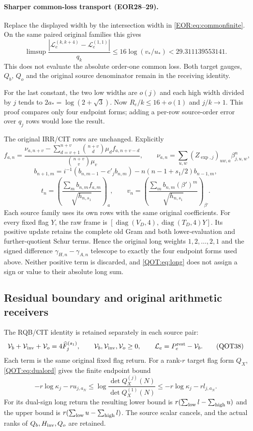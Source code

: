 \documentclass[11pt,a4paper]{article}
\begin{document}
\paragraph{Sharper common-loss transport (EOR28--29).}
Replace the displayed width by the intersection width in
\eqref{EOR:eq:commonfinite}. On the same paired original families this gives
\[
 \limsup\frac{|\mathcal L_e^{(k,k+4)}-\mathcal L_e^{(1,1)}|}{q_k}
 \le16\log(v_*/u_*)<29.311139553141.
\]
This does not evaluate the absolute order-one common loss. Both target gauges,
$Q_b$, $Q_o$ and the original source denominator remain in the receiving identity.

For the last constant, the two low widths are $o(j)$ and each high width divided by $j$ tends to $2a_*=\log(2+\sqrt3)$. Now $R_e/k\le16+o(1)$ and $j/k\to1$. This proof compares only four endpoint forms; adding a per-row source-order error over $q_j$ rows would lose the result.

The original IRR/CIT rows are unchanged. Explicitly
\[
 f_{a,n}=\frac{\nu_{a,n+v}-\sum_{d=v+1}^{n+v}\binom{n+v}{d}\mu_df_{a,n+v-d}}
                  {\binom{n+v}{v}\mu_v},
 \qquad \nu_{a,n}=\sum_{u,w}(Z_{\exp,j})_{uw,a}\beta_{j,u,w}^{n},
\]
\[
 b_{n+1,m}=i^{-1}(b_{n,m-1}-c'_jb_{n,m})
              -n(n-1+s_1/2)b_{n-1,m},
\]
\[
 t_n=\left(\frac{\sum_m b_{n,m}f_{a,m}}{\sqrt{h_{n,s_1}}}\right)_a,
 \qquad v_n=\left(\frac{\sum_m b_{n,m}(\beta')^m}{\sqrt{h_{n,s_1}}}\right)_{\beta'}.
\]
Each source family uses its own rows with the same original coefficients. For every fixed flag $Y$, the raw frame is $[\operatorname{diag}(V_D,4),\operatorname{diag}(T_D,4)Y]$. Its positive update retains the complete old Gram and both lower-evaluation and further-quotient Schur terms. Hence the original long weights $1,2,\ldots,2,1$ and the signed difference $\gamma_{H,n}-\gamma_{A,n}$ telescope to exactly the four endpoint forms used above. Neither positive term is discarded, and \eqref{QOT:eq:long} does not assign a sign or value to their absolute long sum.

\subsection{Residual boundary and original arithmetic receivers}
The RQB/CIT identity is retained separately in each source pair:
\begin{equation}
 \mathcal V_b+\mathcal V_{\rm inv}+\mathcal V_o
       =4\widehat F_j^{(s_1)},\qquad
 \mathcal V_b,\mathcal V_{\rm inv},\mathcal V_o\ge0,
 \qquad \mathcal L_e=P_e^{\rm rest}-\mathcal V_b.
 \label{QOT:eq:RQB}
\tag{QOT38}
\end{equation}
Each term is the same original fixed flag return. For a rank-$r$ target flag form $Q_X$, \eqref{QOT:eq:dualord} gives the finite endpoint bound
\[
 -r\log\kappa_j-r u_{j,a_N}
 \le \log\frac{\det Q_X^{(j)}(N)}{\det Q_X^{(1)}(N)}
 \le-r\log\kappa_j-r l_{j,a_N}.
\]
For its dual-sign long return the resulting lower bound is $r(\sum_{\rm low}l-\sum_{\rm high}u)$ and the upper bound is $r(\sum_{\rm low}u-\sum_{\rm high}l)$. The source scalar cancels, and the actual ranks of $Q_b,H_{\rm inv},Q_o$ are retained.
\end{document}
